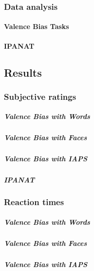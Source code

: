 \documentclass[man]{apa6}
\let\oldparagraph\paragraph
\renewcommand{\paragraph}[1]{\oldparagraph{#1}\mbox{}}
\let\oldsubparagraph\subparagraph
\renewcommand{\subparagraph}[1]{\oldsubparagraph{#1}\mbox{}}
\begin{document}
\hypertarget{data-analysis}{%
\subsubsection{Data analysis}\label{data-analysis}}

\hypertarget{valence-bias-tasks-1}{%
\paragraph{Valence Bias Tasks}\label{valence-bias-tasks-1}}

\hypertarget{ipanat-2}{%
\paragraph{IPANAT}\label{ipanat-2}}

\hypertarget{results-1}{%
\subsection{Results}\label{results-1}}

\hypertarget{subjective-ratings}{%
\subsubsection{Subjective ratings}\label{subjective-ratings}}

\hypertarget{valence-bias-with-words-1}{%
\subparagraph{Valence Bias with Words}\label{valence-bias-with-words-1}}

\hypertarget{valence-bias-with-faces-1}{%
\subparagraph{Valence Bias with Faces}\label{valence-bias-with-faces-1}}

\hypertarget{valence-bias-with-iaps-1}{%
\subparagraph{Valence Bias with IAPS}\label{valence-bias-with-iaps-1}}

\hypertarget{ipanat-3}{%
\subparagraph{IPANAT}\label{ipanat-3}}

\hypertarget{reaction-times}{%
\subsubsection{Reaction times}\label{reaction-times}}

\hypertarget{valence-bias-with-words-2}{%
\subparagraph{Valence Bias with Words}\label{valence-bias-with-words-2}}

\hypertarget{valence-bias-with-faces-2}{%
\subparagraph{Valence Bias with Faces}\label{valence-bias-with-faces-2}}

\hypertarget{valence-bias-with-iaps-2}{%
\subparagraph{Valence Bias with IAPS}\label{valence-bias-with-iaps-2}}
\end{document}
